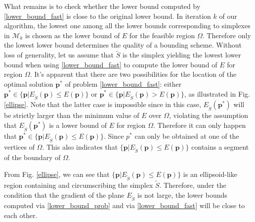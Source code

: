 \documentclass[11pt,bezier,]{article}
\begin{document}
What remains  is to check whether  the  lower bound computed by  \eqref{lower_bound_fast} is 
close to the original lower bound.
In iteration $k$ of our algorithm,
the lowest one among all the lower bounds corresponding to simplexes in $\mathscr M_k$ 
is chosen as the lower bound of $E$ for the feasible region $\Omega$.
Therefore only the lowest  lower bound determines the quality of a bounding scheme.
Without loss of generality,
let us assume that  $\widetilde S$ is the simplex yielding the lowest  lower bound 
when using  \eqref{lower_bound_fast}  to compute the lower bound of $E$ for region $\Omega$.
It's apparent that there are two possibilities 
for the location of the optimal solution $\mathbf p^*$ of problem \eqref{lower_bound_fast}: 
either $\mathbf p^*\in\{\mathbf p|  E_{\widetilde S}(\mathbf p)\le E(\mathbf p) \}$ or 
$\mathbf p^*\in\{\mathbf p| E_{\widetilde S}(\mathbf p)> E(\mathbf p)\}$,
as illustrated in Fig. \ref{ellipse}.
Note that the latter case is impossible
since in this case, 
$E_{\widetilde S}(\mathbf p^*)$ will be strictly larger 
than the minimum  value of $E$ over  $\Omega$,
violating  the assumption that $E_{\widetilde S}(\mathbf p^*)$ is a lower bound of $E$ for region $\Omega$.
Therefore it can only happen that $\mathbf p^*\in\{\mathbf p|  E_{\widetilde S}(\mathbf p)\le E(\mathbf p) \}$.
Since $p^*$ can only be obtained  at one of the vertices of $\Omega$.
This also indicates that  $\{\mathbf p|  E_{\widetilde S}(\mathbf p)\le E(\mathbf p) \}$
contains a segment of the boundary of $\Omega$.

From Fig. \ref{ellipse}, we can see that $\{\mathbf p|  E_{\widetilde S}(\mathbf p)\le E(\mathbf p) \}$
 is an ellipsoid-like region containing  and circumscribing the simplex $\widetilde S$. %
Therefore,
under the condition that the gradient of the plane $E_{\widetilde S}$ is not large,
the  lower bounds computed via \eqref{lower_bound_prob} and  via \eqref{lower_bound_fast}
will be close to each other.






\end{document}
